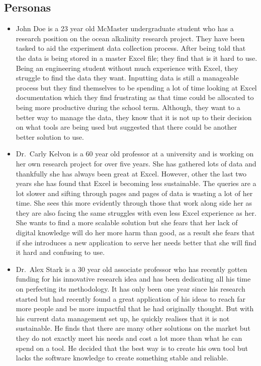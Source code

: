 \documentclass[12pt]{article}
\begin{document}
\subsection{Personas}
\label{personas}
\begin{itemize}
  \item John Doe is a 23 year old McMaster undergraduate student who has a
  research position on the ocean alkalinity research project. They have been
  tasked to aid the experiment data collection process. After being told that
  the data is being stored in a master Excel file; they find that is it hard to
  use. Being an engineering student without much experience with Excel, they
  struggle to find the data they want. Inputting data is still a manageable
  process but they find themselves to be spending a lot of time looking at Excel
  documentation which they find frustrating as that time could be allocated to
  being more productive during the school term. Although, they want to a better
  way to manage the data, they know that it is not up to their decision on what
  tools are being used but suggested that there could be another better solution
  to use. 
  \item Dr.\ Carly Kelvon is a 60 year old professor at a university and
  is working on her own research project for over five years. She has gathered
  lots of data and thankfully she has always been great at Excel. However, other
  the last two years she has found that Excel is becoming less sustainable. The
  queries are a lot slower and sifting through pages and pages of data is
  wasting a lot of her time. She sees this more evidently through those that
  work along side her as they are also facing the same struggles with even less
  Excel experience as her. She wants to find a more scalable solution but she
  fears that her lack of digital knowledge will do her more harm than good, as a
  result she fears that if she introduces a new application to serve her needs
  better that she will find it hard and confusing to use. 
  \item Dr.\ Alex Stark is a 30 year old associate professor who has recently
  gotten funding for his innovative research idea and has been dedicating all
  his time on perfecting its methodology. It has only been one year since his
  research started but had recently found a great application of his ideas to
  reach far more people and be more impactful that he had originally thought.
  But with his current data management set up, he quickly realises that it is not
  sustainable. He finds that there are many other solutions on the market but
  they do not exactly meet his needs and cost a lot more than what he can spend
  on a tool. He decided that the best way is to create his own tool but lacks
  the software knowledge to create something stable and reliable. 
\end{itemize}
    
\end{document}
